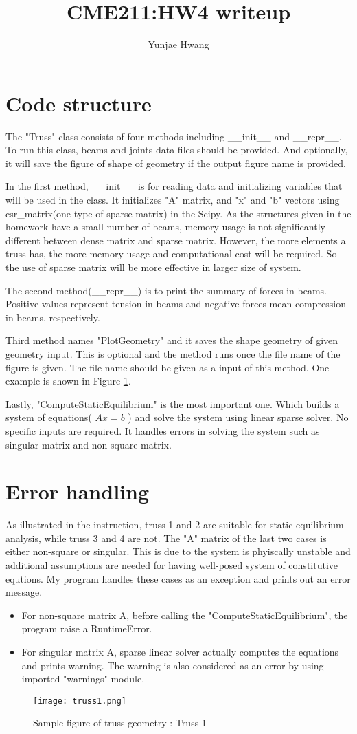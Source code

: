 \documentclass{article}
\title{CME211:HW4 writeup}
\author{Yunjae Hwang}
\begin{document}
\maketitle


\section*{Code structure}
The "Truss" class consists of four methods including \_\_init\_\_ and \_\_repr\_\_.
To run this class, beams and joints data files should be provided.
And optionally, it will save the figure of shape of geometry if the output figure name is provided.

In the first method, \_\_init\_\_ is for reading data and initializing variables that will be used in the class.
It initializes "A" matrix, and "x" and "b" vectors using csr\_matrix(one type of sparse matrix) in the Scipy.
As the structures given in the homework have a small number of beams, 
memory usage is not significantly different between dense matrix and sparse matrix.
However, the more elements a truss has, the more memory usage and computational cost will be required.
So the use of sparse matrix will be more effective in larger size of system.

The second method(\_\_repr\_\_) is to print the summary of forces in beams.
Positive values represent tension in beams and negative forces mean compression in beams, respectively.


Third method names "PlotGeometry" and it saves the shape geometry of given geometry input.
This is optional and the method runs once the file name of the figure is given.
The file name should be given as a input of this method.
One example is shown in Figure \ref{fig:truss}.


Lastly, "ComputeStaticEquilibrium" is the most important one.
Which builds a system of equations( $Ax=b$ ) and solve the system using linear sparse solver.
No specific inputs are required.
It handles errors in solving the system such as singular matrix and non-square matrix.


\section*{Error handling}
As illustrated in the instruction, truss 1 and 2 are suitable for static equilibrium analysis,
while truss 3 and 4 are not. The "A" matrix of the last two cases is either non-square or singular.
This is due to the system is phyiscally unstable and additional assumptions are needed for having 
well-posed system of constitutive equtions.
My program handles these cases as an exception and prints out an error message.
\begin{itemize}
\item For non-square matrix A, before calling the "ComputeStaticEquilibrium", the program raise a RuntimeError.
\item For singular matrix A, sparse linear solver actually computes the equations and prints warning.
The warning is also considered as an error by using imported "warnings" module.
\end{itemize}


\begin{figure}
    \centering
    \texttt{[image: truss1.png]}
    \caption{\label{fig:truss}Sample figure of truss geometry : Truss 1}
\end{figure}
\end{document}

